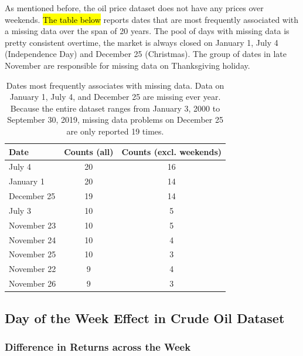 \documentclass[12pt]{article}
\begin{document}
	\par As mentioned before, the oil price dataset does not have any prices over weekends. \hl{The table below} reports dates that are most frequently associated with a missing data over the span of 20 years. The pool of days with missing data is pretty consistent overtime, the market is always closed on January 1, July 4 (Independence Day) and December 25 (Christmas). The group of dates in late November are responsible for missing data on Thanksgiving holiday.
	\begin{table}[H]
		\small
		\center
		\begin{tabular}{|l|c c|}
			\hline
			Date & Counts (all) & Counts (excl. weekends) \\
			\hline
			July 4 & 20 & 16 \\
			January 1 & 20 & 14 \\
			December 25 & 19 & 14 \\
			July 3 & 10 & 5 \\
			November 23 & 10 & 5 \\
			November 24 & 10 & 4\\
			November 25 & 10 & 3\\
			November 22 & 9 & 4 \\
			November 26 & 9 & 3 \\
			\hline
		\end{tabular}
		\caption{Dates most frequently associates with missing data. Data on January 1, July 4, and December 25 are missing ever year. Because the entire dataset ranges from January 3, 2000 to September 30, 2019, missing data problems on December 25 are only reported 19 times.}
	\end{table}
 
	\subsection{Day of the Week Effect in Crude Oil Dataset}
	\subsubsection{Difference in Returns across the Week}
\end{document}

